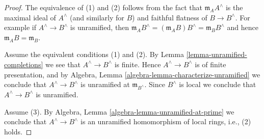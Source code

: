 \documentclass[10pt,a4paper]{amsart}
\theoremstyle{plain}
\theoremstyle{definition}
\theoremstyle{remark}
\numberwithin{equation}{subsection}
\begin{document}
\begin{proof}
The equivalence of (1) and (2) follows from the fact that
$\mathfrak m_AA^\wedge$ is the maximal ideal of $A^\wedge$
(and similarly for $B$) and faithful flatness of $B \to B^\wedge$.
For example if $A^\wedge \to B^\wedge$ is unramified, then
$\mathfrak m_AB^\wedge = (\mathfrak m_AB)B^\wedge = \mathfrak m_BB^\wedge$
and hence $\mathfrak m_AB = \mathfrak m_B$.

\medskip\noindent
Assume the equivalent conditions (1) and (2).
By Lemma \ref{lemma-unramified-completions}
we see that $A^\wedge \to B^\wedge$ is
finite. Hence $A^\wedge \to B^\wedge$ is of finite presentation, and by
Algebra, Lemma \ref{algebra-lemma-characterize-unramified}
we conclude that $A^\wedge \to B^\wedge$ is unramified at
$\mathfrak m_{B^\wedge}$. Since $B^\wedge$ is local we conclude
that $A^\wedge \to B^\wedge$ is unramified.

\medskip\noindent
Assume (3). By Algebra, Lemma \ref{algebra-lemma-unramified-at-prime}
we conclude that $A^\wedge \to B^\wedge$ is an unramified homomorphism
of local rings, i.e., (2) holds.
\end{proof}
\end{document}
